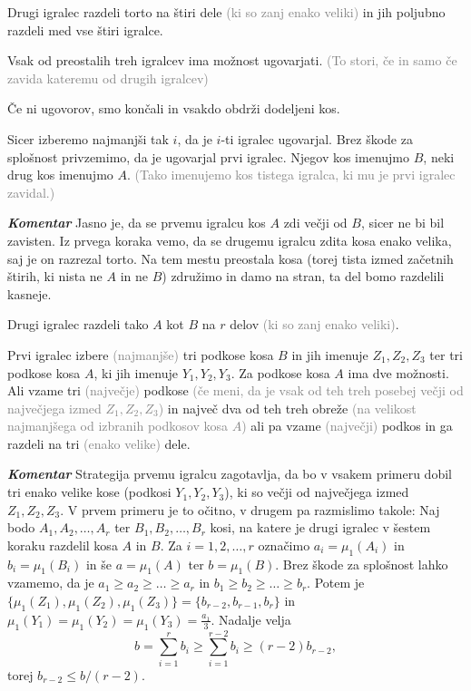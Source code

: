 \documentclass[a4paper,12pt]{article}
\begin{document}
\begin{protokol}

\item Drugi igralec razdeli torto na štiri dele \textcolor{gray}{(ki so zanj enako veliki)} in jih poljubno razdeli med vse štiri igralce.

\item Vsak od preostalih treh igralcev ima možnost ugovarjati. \textcolor{gray}{(To stori, če in samo če zavida kateremu od drugih igralcev)}

\item Če ni ugovorov, smo končali in vsakdo obdrži dodeljeni kos.

\item Sicer izberemo najmanjši tak $i$, da je $i$-ti igralec ugovarjal. Brez škode za splošnost privzemimo, da je ugovarjal prvi igralec. Njegov kos imenujmo $B$, neki drug kos imenujmo $A$. \textcolor{gray}{(Tako imenujemo kos tistega igralca, ki mu je prvi igralec zavidal.)} %

\item [\textbf{\em Komentar}] Jasno je, da se prvemu igralcu kos $A$ zdi večji od $B$, sicer ne bi bil zavisten. Iz prvega koraka vemo, da se drugemu igralcu zdita kosa enako velika, saj je on razrezal torto. Na tem mestu preostala kosa (torej tista izmed začetnih štirih, ki nista ne $A$ in ne $B$) združimo in damo na stran, ta del bomo razdelili kasneje.

\item Drugi igralec razdeli tako $A$ kot $B$ na $r$ delov \textcolor{gray}{(ki so zanj enako veliki)}.

\item Prvi igralec izbere \textcolor{gray}{(najmanjše)} tri podkose kosa $B$ in jih imenuje $Z_1, Z_2, Z_3$ ter tri podkose kosa $A$, ki jih imenuje $Y_1, Y_2, Y_3$. Za podkose kosa $A$ ima dve možnosti. Ali vzame tri \textcolor{gray}{(največje)} podkose \textcolor{gray}{(če meni, da je vsak od teh treh posebej večji od največjega izmed $Z_1, Z_2, Z_3$)} in največ dva od teh treh obreže \textcolor{gray}{(na velikost najmanjšega od izbranih podkosov kosa $A$)} ali pa vzame \textcolor{gray}{(največji)} podkos in ga razdeli na tri \textcolor{gray}{(enako velike)} dele.

\item [\textbf{\em Komentar}] Strategija prvemu igralcu zagotavlja, da bo v vsakem primeru dobil tri enako velike kose (podkosi $Y_1, Y_2, Y_3$), ki so večji od največjega izmed $Z_1, Z_2, Z_3$. V prvem primeru je to očitno, v drugem pa razmislimo takole: Naj bodo $A_1, A_2, \ldots, A_r$ ter $B_1, B_2, \ldots, B_r$ kosi, na katere je drugi igralec v šestem koraku razdelil kosa $A$ in $B$. Za $i = 1, 2, \ldots, r$ označimo $a_i = \mu_1 (A_i)$ in  $b_i = \mu_1 (B_i)$ in še $a = \mu_1(A)$ ter $b = \mu_1(B)$. Brez škode za splošnost lahko vzamemo, da je $a_1 \geq a_2 \geq \ldots \geq a_r$ in $b_1 \geq b_2 \geq \ldots \geq b_r$. Potem je $\{ \mu_1(Z_1), \mu_1(Z_2), \mu_1(Z_3)\} = \{b_{r-2},b_{r-1},b_r\}$ in $\mu_1(Y_1) = \mu_1(Y_2) = \mu_1(Y_3) = \frac{a_1}{3}$. Nadalje velja $$b = \sum_{i=1}^r b_i \geq  \sum_{i=1}^{r-2} b_i \geq (r-2) b_{r-2},$$ torej $b_{r-2} \leq b/(r-2)$.


\end{protokol}
\end{document}
